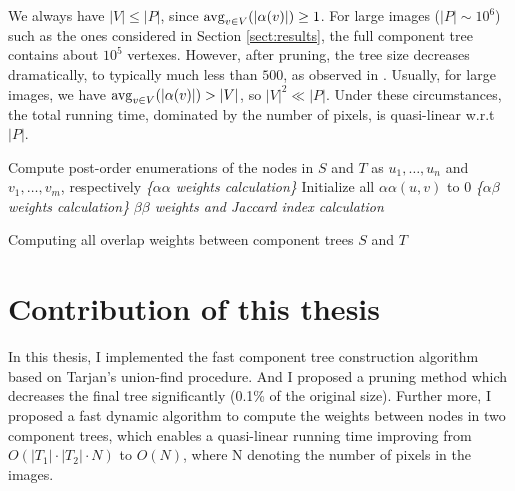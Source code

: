 We always have $|V|\le|P|$, since $\mathrm{avg}_{v\in V}(|\alpha(v)|) \ge 1$.
For large images ($|P| \sim 10^6$) such as the ones considered in Section
\ref{sect:results}, the full component tree contains about $10^5$ vertexes.  
However, after pruning, the tree size decreases dramatically, to typically much
less than $500$, as observed in \cite{Xiao:2011}.  
Usually, for large images, we have $\mathrm{avg}_{v\in V}(|\alpha(v)|) > |V|$, so $|V|^2
\ll |P|$. Under these circumstances, the total running time, dominated by the
number of pixels, is quasi-linear w.r.t $|P|$.

\begin{algorithm}[H]
\SetAlgoLined
{}
Compute post-order enumerations of the nodes in $S$ and $T$ as $u_1,\ldots,u_n$ and $v_1, \ldots, v_m$, respectively\;
\emph{\{$\alpha\alpha$ weights calculation\}}\;
Initialize all $\alpha\alpha(u,v)$ to 0\;
\emph{\{$\alpha\beta$ weights calculation\}}\;
\emph{$\beta\beta$ weights and Jaccard index calculation}\;
\caption{Computing all overlap weights between component trees $S$ and $T$}
\label{alg:cptree-weights}
\end{algorithm}

\section{Contribution of this thesis}
In this thesis, I implemented the fast component tree construction algorithm based on Tarjan’s union-find procedure. And I proposed a pruning method which decreases the final tree significantly (0.1\% of the original size). Further more, I proposed a fast dynamic algorithm to compute the weights between nodes in two component trees, which enables a quasi-linear running time improving from $O(|T_1| \cdot |T_2| \cdot N )$ to $O(N )$, where N denoting the number of pixels in the images. 

